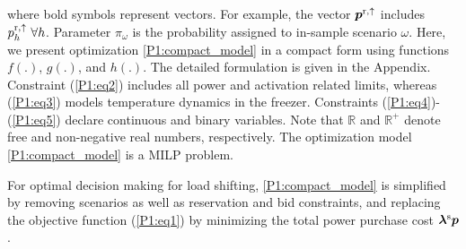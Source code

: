 \documentclass[11pt,a4paper]{article}
\begin{document}
%
where bold symbols represent vectors. For example, the vector $\bm{p}^{\rm{r},\uparrow}$ includes $p_{h}^{\rm{r},\uparrow} \ \forall{h}$. Parameter $\pi_{\omega}$ is the probability assigned to in-sample scenario $\omega$. Here, we present optimization \eqref{P1:compact_model} in a compact form using functions $f(.)$, $g(.)$, and $h(.)$. The detailed formulation is given in the Appendix. Constraint (\ref{P1:eq2}) includes all power and activation related limits, whereas (\ref{P1:eq3}) models temperature dynamics in the freezer. Constraints (\ref{P1:eq4})-(\ref{P1:eq5}) declare continuous and binary variables. Note that $\mathbb{R}$ and $\mathbb{R}^{+}$ denote free and non-negative real numbers, respectively. The optimization model \eqref{P1:compact_model} is a MILP problem.


For optimal decision making for load shifting, \eqref{P1:compact_model} is simplified by removing scenarios as well as reservation and bid constraints, and replacing the objective function (\ref{P1:eq1}) by minimizing the total power purchase cost $\bm{\lambda}^{\rm{s}} \bm{p}$.
\end{document}
